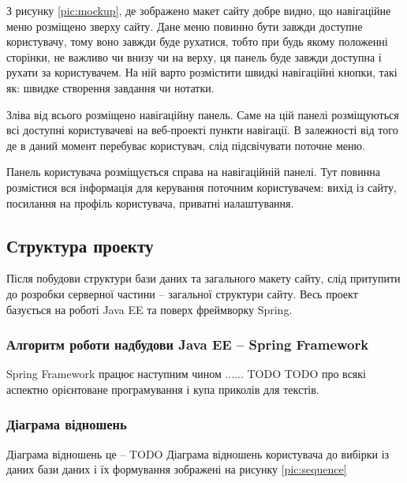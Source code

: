 \par З рисунку \ref{pic:mockup}, де зображено макет сайту добре видно, що навігаційне меню розміщено зверху сайту. Дане меню повинно бути завжди доступне користувачу, тому воно завжди буде рухатися, тобто при будь якому положенні сторінки, не важливо чи внизу чи на верху, ця панель буде завжди доступна і рухати за користувачем. На ній варто розмістити швидкі навігаційні кнопки, такі як: швидке створення завдання чи нотатки.
\par Зліва від всього розміщено навігаційну панель. Саме на цій панелі розміщуються всі доступні  користувачеві на веб-проекті пункти навігації. В залежності від того де в даний момент перебуває користувач, слід підсвічувати поточне меню.
\par Панель користувача розміщується справа на навігаційній панелі. Тут повинна розмістися вся інформація для керування поточним користувачем: вихід із сайту, посилання на профіль користувача, приватні налаштування.

\subsection{Структура проекту}
\par Після побудови структури бази даних та загального макету сайту, слід притупити до розробки серверної частини -- загальної структури сайту. Весь проект базується на роботі Java EE та поверх фреймворку Spring.

\subsubsection{Алгоритм роботи надбудови Java EE -- Spring Framework}
Spring Framework працює наступним чином ...... TODO
TODO про всякі аспектно орієнтоване програмування і купа приколів для текстів.

\subsubsection{Діаграма відношень}
Діаграма відношень це -- TODO 
Діаграма відношень користувача до вибірки із даних бази даних і їх формування зображені на рисунку \ref{pic:sequence}

